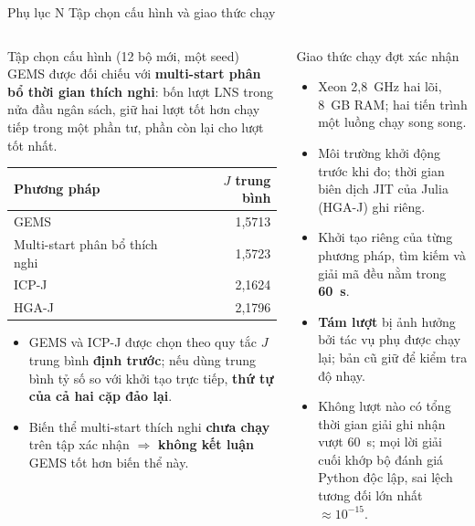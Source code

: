 \documentclass[aspectratio=169,10pt,t,xcolor={table}]{beamer}
\newcommand{\apptitle}[2]{Phụ lục #1 \textperiodcentered{} #2}
\begin{document}
\begin{frame}{\apptitle{N}{Tập chọn cấu hình và giao thức chạy}}
\begin{columns}[T,onlytextwidth]
\begin{block}{Tập chọn cấu hình (12 bộ mới, một seed)}
\scriptsize GEMS được đối chiếu với \textbf{multi-start phân bổ thời gian thích nghi}: bốn lượt LNS trong nửa đầu ngân sách, giữ hai lượt tốt hơn chạy tiếp trong một phần tư, phần còn lại cho lượt tốt nhất.
\vspace{3pt}

\renewcommand{\arraystretch}{1.15}
\begin{tabular}{@{}lr@{}}
\toprule
\textbf{Phương pháp} & $J$ \textbf{trung bình}\\\midrule
\rowcolor{hred!7}GEMS & 1,5713\\
Multi-start phân bổ thích nghi & 1,5723\\
ICP-J & 2,1624\\
HGA-J & 2,1796\\
\bottomrule
\end{tabular}
\vspace{3pt}
\begin{itemize}
\item GEMS và ICP-J được chọn theo quy tắc $J$ trung bình \textbf{định trước}; nếu dùng trung bình tỷ số so với khởi tạo trực tiếp, \textbf{thứ tự của cả hai cặp đảo lại}.
\item Biến thể multi-start thích nghi \textbf{chưa chạy} trên tập xác nhận $\Rightarrow$ \textbf{không kết luận} GEMS tốt hơn biến thể này.
\end{itemize}
\end{block}
\begin{block}{Giao thức chạy đợt xác nhận}
\scriptsize
\begin{itemize}
\item Xeon 2,8~GHz hai lõi, 8~GB RAM; hai tiến trình một luồng chạy song song.
\item Môi trường khởi động trước khi đo; thời gian biên dịch JIT của Julia (HGA-J) ghi riêng.
\item Khởi tạo riêng của từng phương pháp, tìm kiếm và giải mã đều nằm trong \textbf{60~s}.
\item \textbf{Tám lượt} bị ảnh hưởng bởi tác vụ phụ được chạy lại; bản cũ giữ để kiểm tra độ nhạy.
\item Không lượt nào có tổng thời gian giải ghi nhận vượt 60~s; mọi lời giải cuối khớp bộ đánh giá Python độc lập, sai lệch tương đối lớn nhất $\approx10^{-15}$.
\end{itemize}
\end{block}
\end{columns}
\end{frame}
\end{document}

